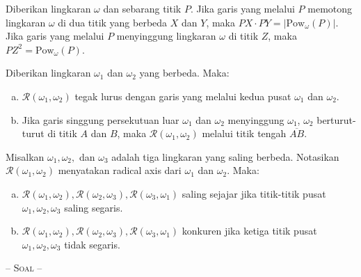 \documentclass[a4paper, 11pt]{article}
\begin{document}
\begin{tcolorbox}[colback=blue!5!white,colframe=blue!75!black,title=\textbf{Teorema 5: Power of Point Theorem}]
Diberikan lingkaran $\omega$ dan sebarang titik $P$. Jika garis yang melalui $P$ memotong lingkaran $\omega$ di dua titik yang berbeda $X$ dan $Y$, maka $PX\cdot PY=|\text{Pow}_\omega(P)|$. Jika garis yang melalui $P$ menyinggung lingkaran $\omega$ di titik $Z$, maka $PZ^2=\text{Pow}_\omega(P)$.
\end{tcolorbox}
\begin{tcolorbox}[colback=blue!5!white,colframe=blue!75!black,title=\textbf{Sifat 6: Radical Axis}]
Diberikan lingkaran $\omega_1$ dan $\omega_2$ yang berbeda. Maka:
\begin{enumerate}[(a).]
\item $\mathcal{R}(\omega_1,\omega_2)$ tegak lurus dengan garis yang melalui kedua pusat $\omega_1$ dan $\omega_2$.
\item Jika garis singgung persekutuan luar $\omega_1$ dan $\omega_2$ menyinggung $\omega_1$, $\omega_2$ berturut-turut di titik $A$ dan $B$, maka $\mathcal{R}(\omega_1,\omega_2)$ melalui titik tengah $\overline{AB}$.
\end{enumerate}
\end{tcolorbox}
\begin{tcolorbox}[colback=blue!5!white,colframe=blue!75!black,title=\textbf{Teorema 7: Radical Axis Theorem}]
Misalkan $\omega_1,\omega_2,$ dan $\omega_3$ adalah tiga lingkaran yang saling berbeda. Notasikan $\mathcal{R}(\omega_1,\omega_2)$ menyatakan radical axis dari $\omega_1$ dan $\omega_2$. Maka:
\begin{enumerate}[(a).]
\item $\mathcal{R}(\omega_1,\omega_2),\mathcal{R}(\omega_2,\omega_3),\mathcal{R}(\omega_3,\omega_1)$ saling sejajar jika titik-titik pusat $\omega_1,\omega_2,\omega_3$ saling segaris.
\item $\mathcal{R}(\omega_1,\omega_2),\mathcal{R}(\omega_2,\omega_3),\mathcal{R}(\omega_3,\omega_1)$ konkuren jika ketiga titik pusat $\omega_1,\omega_2,\omega_3$ tidak segaris.
\end{enumerate}
\end{tcolorbox}
\begin{center}
\scshape{-- Soal --}
\end{center}
\end{document}
